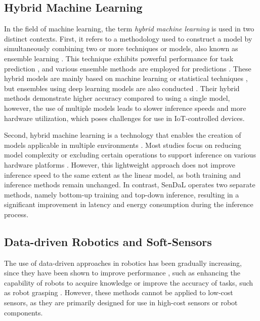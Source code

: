 \subsection{Hybrid Machine Learning}
In the field of machine learning, the term \textit{hybrid machine learning} is used in two distinct contexts. First, it refers to a methodology used to construct a model by simultaneously combining two or more techniques or models, also known as ensemble learning \cite{Oliveira_2014}. This technique exhibits powerful performance for task prediction \cite{Stefenon_2022}, and various ensemble methods are employed for predictions \cite{Gastinger_2021, Zhang_2022, Cawood_2021}. These hybrid models are mainly based on machine learning or statistical techniques \cite{Gastinger_2021, Zhang_2022}, but ensembles using deep learning models are also conducted \cite{Cawood_2021}. Their hybrid methods demonstrate higher accuracy compared to using a single model, however, the use of multiple models leads to slower inference speeds and more hardware utilization, which poses challenges for use in IoT-controlled devices.

Second, hybrid machine learning is a technology that enables the creation of models applicable in multiple environments \cite{Liu_2020}. Most studies focus on reducing model complexity \cite{Liu_2020, Asutkar_2023} or excluding certain operations to support inference on various hardware platforms \cite{David_2020, Aydonat_2017}. However, this lightweight approach does not improve inference speed to the same extent as the linear model, as both training and inference methods remain unchanged. In contrast, SenDaL operates two separate methods, namely bottom-up training and top-down inference, resulting in a significant improvement in latency and energy consumption during the inference process.


\subsection{Data-driven Robotics and Soft-Sensors}
The use of data-driven approaches in robotics has been gradually increasing, since they have been shown to improve performance \cite{Barclay_2022}, such as enhancing the capability of robots to acquire knowledge \cite{Serkan_2019} or improve the accuracy of tasks, such as robot grasping \cite{Gupta_2018, Kleeberger_2020}. However, these methods cannot be applied to low-cost sensors, as they are primarily designed for use in high-cost sensors or robot components.


